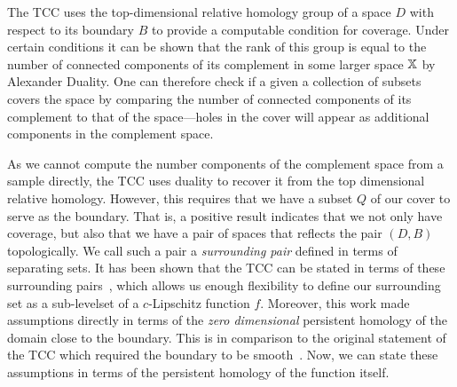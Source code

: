 
The TCC uses the top-dimensional relative homology group of a space $D$ with respect to its boundary $B$ to provide a computable condition for coverage.
Under certain conditions it can be shown that the rank of this group is equal to the number of connected components of its complement in some larger space $\mathbb{X}$ by Alexander Duality.
One can therefore check if a given a collection of subsets covers the space by comparing the number of connected components of its complement to that of the space---holes in the cover will appear as additional components in the complement space.

As we cannot compute the number components of the complement space from a sample directly, the TCC uses duality to recover it from the top dimensional relative homology.
However, this requires that we have a subset $Q$ of our cover to serve as the boundary.
That is, a positive result indicates that we not only have coverage, but also that we have a pair of spaces that reflects the pair $(D, B)$ topologically.
We call such a pair a \emph{surrounding pair} defined in terms of separating sets.
It has been shown that the TCC can be stated in terms of these surrounding pairs~\cite{cavanna2017when}, which allows us enough flexibility to define our surrounding set as a sub-levelset of a $c$-Lipschitz function $f$.
Moreover, this work made assumptions directly in terms of the \emph{zero dimensional} persistent homology of the domain close to the boundary.
This is in comparison to the original statement of the TCC which required the boundary to be smooth~\cite{desilva07coverage}.
Now, we can state these assumptions in terms of the persistent homology of the function itself.

